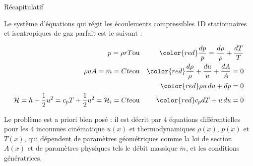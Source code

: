 \begin{frame}{Récapitulatif}

\small

Le système d'équations qui régit les écoulements compressibles 1D stationnaires et isentropiques
de gaz parfait est le suivant :

\begin{eqnarray}
	p = \rho r T  & \mbox{ou} & \color{red} \frac{dp}{p} = \frac{d\rho}{\rho} + \frac{dT}{T}
	\\
	\rho u A = \dot{m} = Cte & \mbox{ou} & \color{red}\frac{d\rho}{\rho} + \frac{du}{u} + \frac{dA}{A} = 0
	\\
	& & \color{red} \rho u \, du + dp = 0
	\\
     {\cal H}  = h + \frac{1}{2}u^2 = c_p T + \frac{1}{2}u^2 = {\cal H}_i = Cte & \mbox{ou} & \color{red} c_p dT + u\, du = 0
\end{eqnarray}

\bigskip

Le problème est a priori bien posé : il est décrit par 4 équations différentielles 
pour les 4 inconnues cinématique $u(x)$
et thermodynamiques $\rho(x)$, $p(x)$ et $T(x)$, qui dépendent de paramètres géométriques
comme la loi de section $A(x)$ et de paramètres physiques tels le débit massique $\dot{m}$, 
et les \textcolor{vert}{conditions génératrices}.

\vspace{10mm}

\end{frame}


